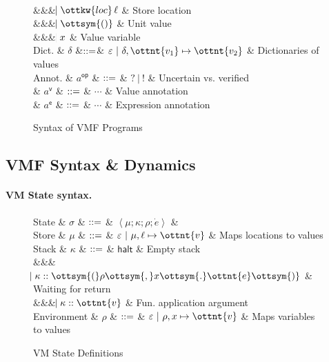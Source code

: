 \begin{figure}
\begin{grammar}
  \\ &&& $\bnfaltbrk \ottkw{loc} \, \ell$ & Store location
  \\ &&& $\bnfaltbrk \ottsym{()}$    & Unit value
  \\ &&& $\hspace{-1.02ex}\mathrel{\mid} x$     & Value variable
  \\
  Dict. & $\delta$
  &$\mathrel{::=}$& $\varepsilon~|~ \delta  ,  \ottnt{v_{{\mathrm{1}}}}  \mapsto  \ottnt{v_{{\mathrm{2}}}} $ & Dictionaries of values
  \\[2mm]
  Annot.
    & $a^{\textsf{op} }$ & $\mathrel{::=}$ & $ \textsf{?} ~|~ \texttt{!} $ & Uncertain vs. verified
  \\
    & $a^\textsf{v}$ & $\mathrel{::=}$ & $\cdots$ & Value annotation
  \\
    & $a^\textsf{e}$ & $\mathrel{::=}$ & $\cdots$ & Expression annotation

\end{grammar}
\caption{Syntax of VMF Programs}
\label{fig-syntax}
\end{figure}

\subsection{VMF Syntax \& Dynamics}


\paragraph{VM State syntax.}

\begin{figure}
  \begin{grammar}
    State
    & $\sigma$ & $\mathrel{::=}$ & $ \left<  \mu ;  \kappa ;  \rho ;  \dot{e}  \right> $ &
    \\
    Store
    & $\mu$ & $\mathrel{::=}$ & $\varepsilon~|~ \mu  ,  \ell \mapsto \ottnt{v} $ & Maps locations to values
    \\
    Stack
    & $\kappa$ & $\mathrel{::=}$ & $ \textsf{halt} $ & Empty stack
    \\
    &&& $\bnfaltbrk \kappa  ::  \ottsym{(}  \rho  \ottsym{,}  x  \ottsym{.}  \ottnt{e}  \ottsym{)}$ & Waiting for return
    \\
    &&& $\bnfaltbrk \kappa  ::  \ottnt{v}$ & Fun. application argument
    \\
    Environment
    & $\rho$   & $\mathrel{::=}$ & $\varepsilon~|~ \rho  ,  x \mapsto \ottnt{v} $ & Maps variables to values
  \end{grammar}
  \caption{VM State Definitions}
  \label{fig:state}
\end{figure}


